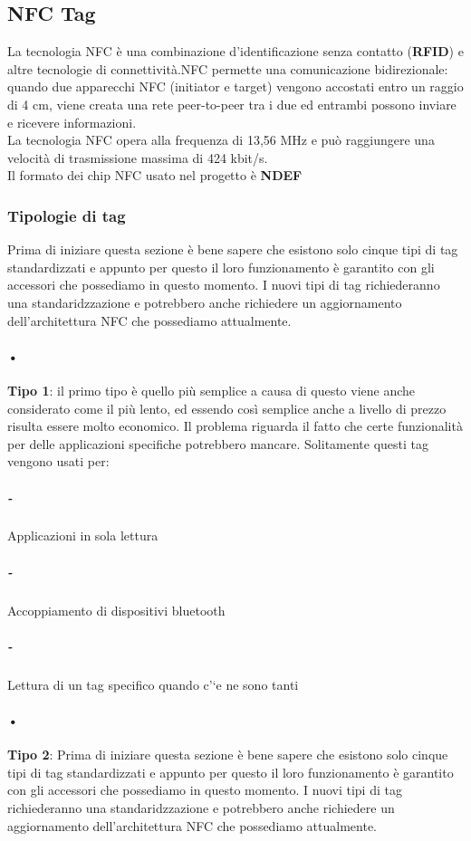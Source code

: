 \subsection{NFC Tag}
\hspace{\parindent}La tecnologia NFC  è una combinazione d'identificazione senza contatto (\textbf{RFID}) e altre tecnologie di connettività.NFC permette una comunicazione bidirezionale: quando due apparecchi NFC (initiator e target) vengono accostati entro un raggio di 4 cm, viene creata una rete peer-to-peer tra i due ed entrambi possono inviare e ricevere informazioni.
\\La tecnologia NFC opera alla frequenza di 13,56 MHz e può raggiungere una velocità di trasmissione massima di 424 kbit/s.
\\Il formato dei chip NFC usato nel progetto è \textbf{NDEF} 
\subsubsection{Tipologie di tag}
\hspace{\parindent}Prima di iniziare questa sezione è bene sapere che esistono solo cinque tipi di tag standardizzati e appunto per questo il loro funzionamento è garantito con gli accessori che possediamo in questo momento. I nuovi tipi di tag richiederanno una standaridzzazione e potrebbero anche richiedere un aggiornamento dell'architettura NFC che possediamo attualmente.

\paragraph{•}\textbf{Tipo 1}: il primo tipo è quello più semplice a causa di questo viene anche considerato come il più lento, ed essendo così semplice anche a livello di prezzo risulta essere molto economico. Il problema riguarda il fatto che certe funzionalità per delle applicazioni specifiche potrebbero mancare. Solitamente questi tag vengono usati per:
\subparagraph{-} Applicazioni in sola lettura
\subparagraph{-}  Accoppiamento di dispositivi bluetooth
\subparagraph{-} Lettura di un tag specifico quando c’`e ne sono tanti

\paragraph{•}\textbf{Tipo 2}:
Prima di iniziare questa sezione è bene sapere che esistono solo cinque tipi di tag standardizzati e appunto per questo il loro funzionamento è garantito con gli accessori che possediamo in questo momento. I nuovi tipi di tag richiederanno una standaridzzazione e potrebbero anche richiedere un aggiornamento dell'architettura NFC che possediamo attualmente.

